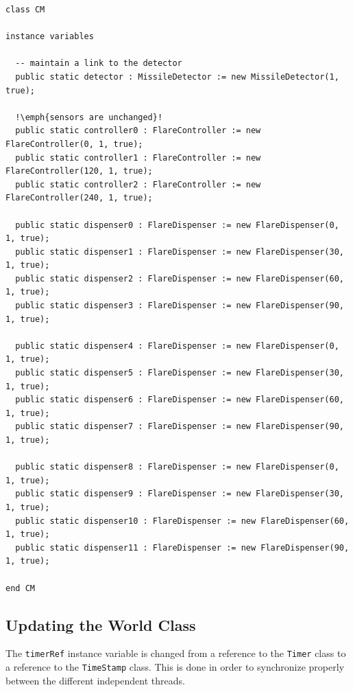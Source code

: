 \documentclass{overturerepchap}
\begin{document}
\begin{lstlisting}
class CM
 
instance variables

  -- maintain a link to the detector
  public static detector : MissileDetector := new MissileDetector(1, true);

  !\emph{sensors are unchanged}! 
  public static controller0 : FlareController := new FlareController(0, 1, true);
  public static controller1 : FlareController := new FlareController(120, 1, true);
  public static controller2 : FlareController := new FlareController(240, 1, true);

  public static dispenser0 : FlareDispenser := new FlareDispenser(0, 1, true);
  public static dispenser1 : FlareDispenser := new FlareDispenser(30, 1, true);
  public static dispenser2 : FlareDispenser := new FlareDispenser(60, 1, true);
  public static dispenser3 : FlareDispenser := new FlareDispenser(90, 1, true);

  public static dispenser4 : FlareDispenser := new FlareDispenser(0, 1, true);
  public static dispenser5 : FlareDispenser := new FlareDispenser(30, 1, true);
  public static dispenser6 : FlareDispenser := new FlareDispenser(60, 1, true);
  public static dispenser7 : FlareDispenser := new FlareDispenser(90, 1, true);

  public static dispenser8 : FlareDispenser := new FlareDispenser(0, 1, true);
  public static dispenser9 : FlareDispenser := new FlareDispenser(30, 1, true);
  public static dispenser10 : FlareDispenser := new FlareDispenser(60, 1, true);
  public static dispenser11 : FlareDispenser := new FlareDispenser(90, 1, true);

end CM
\end{lstlisting}

\subsection{Updating the World Class}

The \texttt{timerRef} instance variable is changed from a reference to 
the \texttt{Timer} class to a reference to the \texttt{TimeStamp} class.
This is done in order to synchronize properly between the different 
independent threads.

\end{document}
